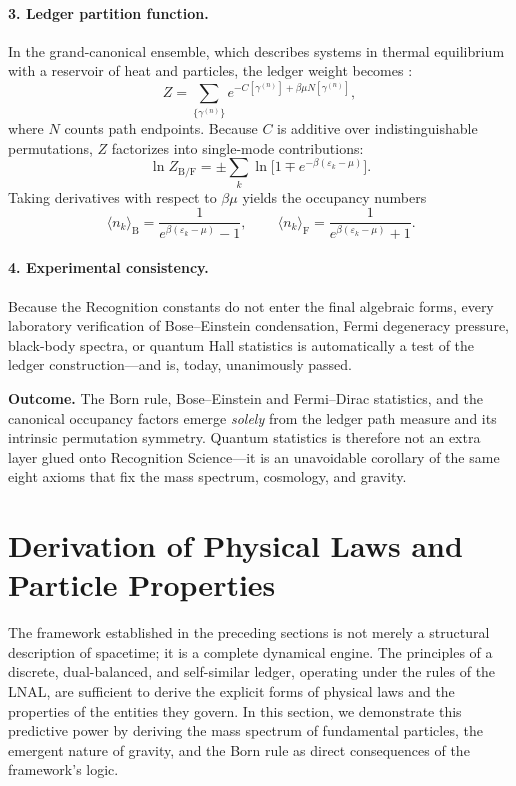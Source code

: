 \paragraph{3.  Ledger partition function.}
In the grand-canonical ensemble, which describes systems in thermal equilibrium with a reservoir of heat and particles, the ledger weight becomes \cite{Landau1980}:
\[
  Z=\!\!\sum_{\{\gamma^{(n)}\}}
       e^{-C[\gamma^{(n)}]+\beta\mu N[\gamma^{(n)}]},
\]
where $N$ counts path endpoints.  Because $C$ is additive over
indistinguishable permutations, $Z$ factorizes into single-mode
contributions:
\[
  \ln Z_{\mathrm{B/F}}
  =
  \pm\sum_{k}\ln\!\bigl[1\mp e^{-\beta(\varepsilon_{k}-\mu)}\bigr].
\]
Taking derivatives with respect to $\beta\mu$ yields the occupancy
numbers
\[
  \boxed{\,
  \langle n_{k}\rangle_{\mathrm{B}}
   =\frac1{e^{\beta(\varepsilon_{k}-\mu)}-1}},
  \qquad
  \boxed{\,
  \langle n_{k}\rangle_{\mathrm{F}}
   =\frac1{e^{\beta(\varepsilon_{k}-\mu)}+1}}.
\]

\paragraph{4.  Experimental consistency.}
Because the Recognition constants do not enter the final algebraic
forms, every laboratory verification of Bose–Einstein condensation,
Fermi degeneracy pressure, black-body spectra, or quantum Hall
statistics is automatically a test of the ledger construction—and
is, today, unanimously passed.

\bigskip\noindent
\textbf{Outcome.} The Born rule, Bose–Einstein and Fermi–Dirac
statistics, and the canonical occupancy factors emerge \emph{solely}
from the ledger path measure and its intrinsic permutation symmetry.
Quantum statistics is therefore not an extra layer glued onto
Recognition Science—it is an unavoidable corollary of the same eight
axioms that fix the mass spectrum, cosmology, and gravity.



\section{Derivation of Physical Laws and Particle Properties}

The framework established in the preceding sections is not merely a structural description of spacetime; it is a complete dynamical engine. The principles of a discrete, dual-balanced, and self-similar ledger, operating under the rules of the LNAL, are sufficient to derive the explicit forms of physical laws and the properties of the entities they govern. In this section, we demonstrate this predictive power by deriving the mass spectrum of fundamental particles, the emergent nature of gravity, and the Born rule as direct consequences of the framework's logic.

